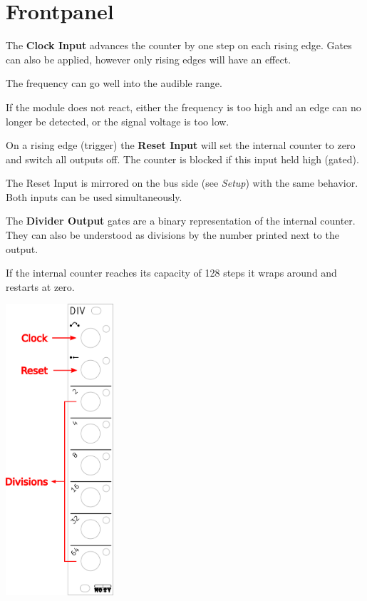 \documentclass[a4paper,
               11pt,
               parskip=half,
               headinclude,
               titlepage=false]{scrartcl}
\begin{document}
\begin{minipage}[]{10.5cm}
\setlength{\parskip}{\medskipamount}
\section*{Frontpanel}

The \textbf{\color{red}Clock Input} advances the counter by one step on each rising edge.
Gates can also be applied, however only rising edges will have an effect.

The frequency can go well into the audible range.

If the module does not react, either the frequency is too high and an edge can no longer be detected, or the signal voltage is too low.

\vspace{1em}

On a rising edge (trigger) the \textbf{\color{red}Reset Input} will set the internal counter to zero and switch all outputs off.
The counter is blocked if this input held high (gated).

The Reset Input is mirrored on the bus side (see \emph{Setup}) with the same behavior. Both inputs can be used simultaneously.%

\vspace{1em}

The \textbf{\color{red}Divider Output} gates are a binary representation of the internal counter. They can also be understood as divisions by the number printed next to the output.

If the internal counter reaches its capacity of 128 steps it wraps around and restarts at zero.

\end{minipage}%
\hspace{0.5cm}
\begin{minipage}[]{4cm}
\includegraphics[width=4cm]{div-frontpanel-labels}
\end{minipage}
\end{document}
